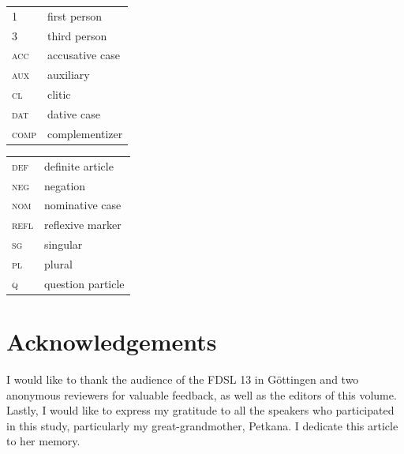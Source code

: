 \documentclass[output=paper,
colorlinks,
citecolor=brown,
newtxmath
]{langscibook}
\begin{document}
\begin{tabularx}{.45\textwidth}{lX}
\textsc{1}&first person\\
\textsc{3}&third person\\
\textsc{acc}&accusative case\\
\textsc{aux}&auxiliary\\
\textsc{cl}&clitic\\
\textsc{dat}&dative case\\
\textsc{comp}&complementizer\\
\end{tabularx}
\begin{tabularx}{.45\textwidth}{lX}
\textsc{def}&definite article\\
\textsc{neg}&negation\\
\textsc{nom}&nominative case\\
\textsc{refl}&reflexive marker\\
\textsc{sg}&singular\\
\textsc{pl}&plural\\
\textsc{q}&question particle\\
\end{tabularx}


\section*{Acknowledgements}

I would like to thank the audience of the FDSL 13 in Göttingen and two anonymous reviewers for valuable feedback, as well as the editors of this volume. Lastly, I would like to express my gratitude to all the speakers who participated in this study, particularly my great-grandmother, Petkana. I dedicate this article to her memory.

\sloppy
\printbibliography[heading=subbibliography,notkeyword=this]
\end{document}
